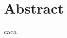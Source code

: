\documentclass[12pt]{report}
\begin{document}

\section*{Abstract}
caca
\clearpage


\tableofcontents
\clearpage




\clearpage
\printbibliography
\end{document}
